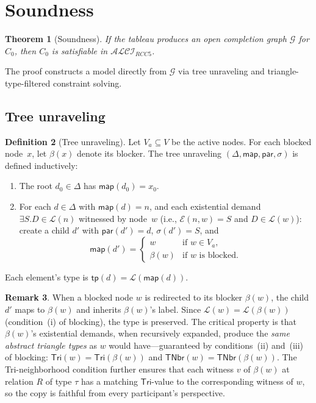 \documentclass[a4paper,11pt]{article}
\newtheorem{theorem}{Theorem}[section]
\theoremstyle{definition}
\newtheorem{definition}[theorem]{Definition}
\newtheorem{remark}[theorem]{Remark}
\newcommand{\ALCIRCC}[1]{\ensuremath{\mathcal{ALCI}_{\mathit{RCC#1}}}}
\newcommand{\tp}{\ensuremath{\mathsf{tp}}}
\newcommand{\Tri}{\ensuremath{\mathsf{Tri}}}
\newcommand{\TNbr}{\ensuremath{\mathsf{TNbr}}}
\newcommand{\GG}{\ensuremath{\mathcal{G}}}
\newcommand{\LL}{\ensuremath{\mathcal{L}}}
\newcommand{\EE}{\ensuremath{\mathcal{E}}}
\begin{document}
\section{Soundness}\label{sec:soundness}

\begin{theorem}[Soundness]\label{thm:soundness}
If the tableau produces an open completion graph $\GG$ for
$C_0$, then $C_0$ is satisfiable in $\ALCIRCC{5}$.
\end{theorem}

The proof constructs a model directly from $\GG$ via tree
unraveling and triangle-type-filtered constraint solving.

\subsection{Tree unraveling}\label{sec:unraveling}

\begin{definition}[Tree unraveling]\label{def:unrav}
Let $V_a \subseteq V$ be the active nodes.  For each blocked
node~$x$, let $\beta(x)$ denote its blocker.  The tree
unraveling $(\Delta, \mathsf{map}, \mathsf{par}, \sigma)$ is
defined inductively:
\begin{enumerate}[nosep]
  \item The root $d_0 \in \Delta$ has $\mathsf{map}(d_0) = x_0$.
  \item For each $d \in \Delta$ with $\mathsf{map}(d) = n$,
    and each existential demand $\exists S.D \in \LL(n)$
    witnessed by node~$w$ (i.e.,
    $\EE(n, w) = S$ and $D \in \LL(w)$): create a child $d'$
    with $\mathsf{par}(d') = d$, $\sigma(d') = S$, and
    \[
    \mathsf{map}(d') = \begin{cases}
      w & \text{if } w \in V_a, \\
      \beta(w) & \text{if } w \text{ is blocked.}
    \end{cases}
    \]
\end{enumerate}
Each element's type is $\tp(d) = \LL(\mathsf{map}(d))$.
\end{definition}

\begin{remark}
When a blocked node $w$ is redirected to its blocker $\beta(w)$,
the child $d'$ maps to $\beta(w)$ and inherits $\beta(w)$'s
label.  Since $\LL(w) = \LL(\beta(w))$ (condition~(i) of
blocking), the type is preserved.  The critical property is
that $\beta(w)$'s existential demands, when recursively
expanded, produce the \emph{same abstract triangle types} as
$w$ would have---guaranteed by conditions~(ii) and~(iii) of
blocking: $\Tri(w) = \Tri(\beta(w))$ and
$\TNbr(w) = \TNbr(\beta(w))$.  The Tri-neighborhood condition
further ensures that each witness $v$ of $\beta(w)$ at relation
$R$ of type $\tau$ has a matching $\Tri$-value to the
corresponding witness of $w$, so the copy is faithful from
every participant's perspective.
\end{remark}
\end{document}
